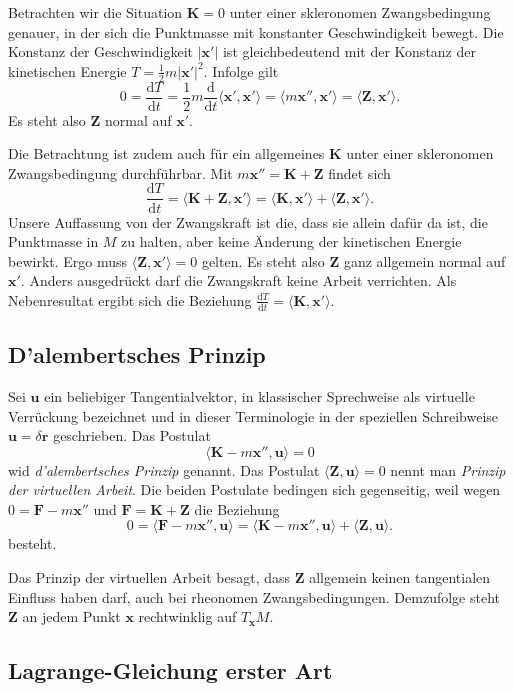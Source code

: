 \documentclass[a4paper,10pt,fleqn,twocolumn,twoside,dvipdfmx]{scrartcl}
\numberwithin{equation}{section}
\newcommand{\bv}[1]{\mathbf{#1}}
\begin{document}
Betrachten wir die Situation $\bv K = 0$ unter einer skleronomen
Zwangsbedingung genauer, in der sich die
Punktmasse mit konstanter Geschwindigkeit bewegt. Die Konstanz
der Geschwindigkeit $|\bv x'|$ ist gleichbedeutend mit der Konstanz
der kinetischen Energie $T = \frac{1}{2}m|\bv x'|^2$. Infolge gilt
\[0=\frac{\mathrm dT}{\mathrm dt}
= \frac{1}{2}m\frac{\mathrm d}{\mathrm dt}\langle\bv x',\bv x'\rangle
= \langle m\bv x'',\bv x'\rangle = \langle\bv Z,\bv x'\rangle.\]
Es steht also $\bv Z$ normal auf $\bv x'$.

Die Betrachtung ist zudem auch für ein allgemeines $\bv K$
unter einer skleronomen Zwangsbedingung durchführbar.
Mit $m\bv x''=\bv K+\bv Z$ findet sich
\[\frac{\mathrm dT}{\mathrm dt} = \langle\bv K+\bv Z,\bv x'\rangle
= \langle\bv K,\bv x'\rangle + \langle\bv Z,\bv x'\rangle.\]
Unsere Auffassung von der Zwangskraft ist die, dass sie allein
dafür da ist, die Punktmasse in $M$ zu halten, aber keine
Änderung der kinetischen Energie bewirkt. Ergo muss
$\langle\bv Z,\bv x'\rangle = 0$ gelten. Es steht also $\bv Z$
ganz allgemein normal auf $\bv x'$. Anders ausgedrückt darf die
Zwangskraft keine Arbeit verrichten. Als Nebenresultat ergibt sich die
Beziehung
$\frac{\mathrm dT}{\mathrm dt} = \langle\bv K,\bv x'\rangle$.

\subsection{D'alembertsches Prinzip}

Sei $\bv u$ ein beliebiger Tangentialvektor, in klassischer Sprechweise
als virtuelle Verrückung bezeichnet und in dieser Terminologie in der
speziellen Schreibweise $\bv u = \delta\bv r$  geschrieben. Das Postulat
\[\langle\bv K-m\bv x'',\bv u\rangle = 0\]
wid \emph{d'alembertsches Prinzip} genannt. Das Postulat
$\langle\bv Z,\bv u\rangle = 0$ nennt man \emph{Prinzip der virtuellen
Arbeit}. Die beiden Postulate bedingen sich gegenseitig, weil wegen
$0 = \bv F-m\bv x''$ und $\bv F = \bv K+\bv Z$ die Beziehung
\[0 = \langle\bv F-m\bv x'',\bv u\rangle =
\langle\bv K-m\bv x'',\bv u\rangle + \langle\bv Z,\bv u\rangle.\]
besteht.

Das Prinzip der virtuellen Arbeit besagt, dass $\bv Z$ allgemein keinen
tangentialen Einfluss haben darf, auch bei rheonomen Zwangsbedingungen.
Demzufolge steht $\bv Z$ an jedem Punkt $\bv x$ rechtwinklig auf
$T_{\bv x} M$.

\subsection{Lagrange-Gleichung erster Art}
\end{document}
